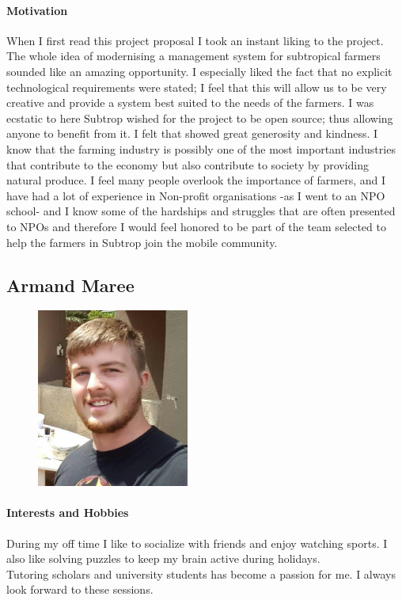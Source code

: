\documentclass[english]{article}
\begin{document}
		\paragraph{Motivation}
		When I first read this project proposal I took an instant liking to the project. The whole idea of modernising a management system for subtropical farmers sounded like an amazing opportunity. I especially liked the fact that no explicit technological requirements were stated; I feel that this will allow us to be very creative and provide a system best suited to the needs of the farmers. I was ecstatic to here Subtrop wished for the project to be open source; thus allowing anyone to benefit from it. I felt that showed great generosity and kindness. I know that the farming industry is possibly one of the most important industries that contribute to the economy but also contribute to society by providing natural produce. I feel many people overlook the importance of farmers, and I have had a lot of experience in Non-profit organisations -as I went to an NPO school- and I know some of the hardships and struggles that are often presented to NPOs and therefore I would feel honored to be part of the team selected to help the farmers in Subtrop join the mobile community.
		
		\subsection{Armand Maree}
			\begin{figure}
				\begin{center}
					\includegraphics[width=5cm]{armand.jpg}
				\end{center}
			\end{figure}
			\paragraph{Interests and Hobbies}
			During my off time I like to socialize with friends and enjoy watching sports. I also like solving puzzles to keep my brain active during holidays.\\
			Tutoring scholars and university students has become a passion for me. I always look forward to these sessions.
			
\end{document}
